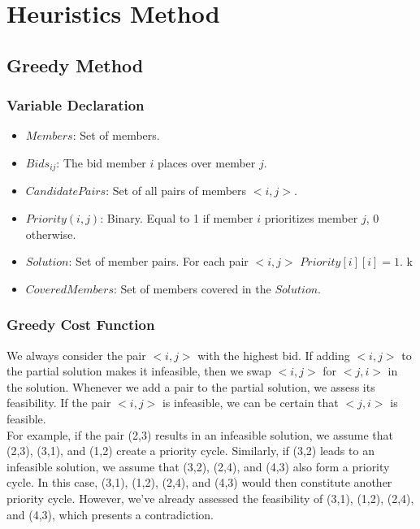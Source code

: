 \documentclass{article}
\begin{document}
\section{Heuristics Method}




\subsection{Greedy Method}

\subsubsection{Variable Declaration} \label{declaration}

\begin{itemize}
    \item $Members$: Set of members.
    \item $Bids_{ij}$: The bid member $i$ places over member $j$.
    \item $CandidatePairs$: Set of all pairs of members $<i,j>$.
    \item $Priority(i,j)$: Binary. Equal to 1 if member $i$ prioritizes member $j$, 0 otherwise.
    \item $Solution$: Set of member pairs. For each pair $<i,j>$ $Priority[i][i] = 1$.
k    \item $CoveredMembers$: Set of members covered in the $Solution$.
    
\end{itemize}

\subsubsection{Greedy Cost Function} \label{greedy_function}

We always consider the pair $<i,j>$ with the highest bid. If adding $<i,j>$ to the partial solution makes it infeasible, then we swap $<i,j>$ for $<j,i>$ in the solution.
Whenever we add a pair to the partial solution, we assess its feasibility. If the pair $<i,j>$ is infeasible, we can be certain that $<j,i>$ is feasible.\\
For example, if the pair (2,3) results in an infeasible solution, we assume that (2,3), (3,1), and (1,2) create a priority cycle. Similarly, if (3,2) leads to an infeasible solution, we assume that (3,2), (2,4), and (4,3) also form a priority cycle. In this case, (3,1), (1,2), (2,4), and (4,3) would then constitute another priority cycle. However, we've already assessed the feasibility of (3,1), (1,2), (2,4), and (4,3), which presents a contradiction.
\end{document}
